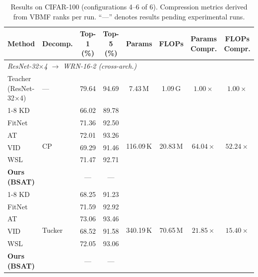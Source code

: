 \documentclass[conference]{IEEEtran}
\begin{document}
\begin{table}[t]
  \centering
  \caption{Results on CIFAR-100 (configurations 4--6 of 6).
    Compression metrics derived from VBMF ranks per run.
    ``—'' denotes results pending experimental runs.}
  \label{tab:cifar100_b}
  \setlength{\tabcolsep}{4pt}
  \begin{tabular}{llcccccc}
    \toprule
    \textbf{Method} & \textbf{Decomp.} &
    \textbf{Top-1 (\%)} & \textbf{Top-5 (\%)} &
    \textbf{Params} & \textbf{FLOPs} &
    \textbf{Params Compr.} & \textbf{FLOPs Compr.} \\
    \midrule

    \multicolumn{8}{l}{\textit{ResNet-32$\times$4 $\to$ WRN-16-2 {\scriptsize(cross-arch.)}}} \\
    \midrule
    Teacher (ResNet-32$\times$4) & — & 79.64 & 94.69 & 7.43\,M & 1.09\,G & $1.00\times$ & $1.00\times$ \\
    \cline{1-8}
    KD \cite{hinton2015distilling}                 & \multirow{6}{*}{CP}     & 66.02 & 89.78 & \multirow{6}{*}{116.09\,K} & \multirow{6}{*}{20.83\,M} & \multirow{6}{*}{$64.04\times$}    & \multirow{6}{*}{$52.24\times$} \\
    FitNet \cite{romero2015fitnetshintsdeepnets}   &                         & 71.36 & 92.50 & & & & \\
    AT \cite{zagoruyko2016paying}                  &                         & 72.01 & 93.26 & & & & \\
    VID \cite{ahn2019variational}                  &                         & 69.29 & 91.46 & & & & \\
    WSL \cite{zhou2021rethinking}                  &                         & 71.47 & 92.71 & & & & \\
    \textbf{Ours (BSAT)}                           &                         & — & — & & & & \\
    \cline{1-8}
    KD \cite{hinton2015distilling}                 & \multirow{6}{*}{Tucker} & 68.25 & 91.23 & \multirow{6}{*}{340.19\,K} & \multirow{6}{*}{70.65\,M} & \multirow{6}{*}{$21.85\times$}    & \multirow{6}{*}{$15.40\times$} \\
    FitNet \cite{romero2015fitnetshintsdeepnets}   &                         & 71.59 & 92.92 & & & & \\
    AT \cite{zagoruyko2016paying}                  &                         & 73.06 & 93.46 & & & & \\
    VID \cite{ahn2019variational}                  &                         & 68.52 & 91.58 & & & & \\
    WSL \cite{zhou2021rethinking}                  &                         & 72.05 & 93.06 & & & & \\
    \textbf{Ours (BSAT)}                           &                         & — & — & & & & \\
    \midrule


\end{tabular}
\end{table}
\end{document}
